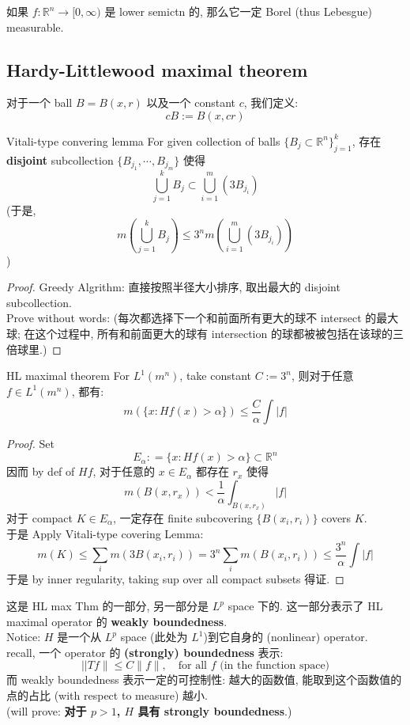 \documentclass[lang=cn,11pt]{elegantbook}
\begin{document}
\begin{corollary}
    如果 $f:\mathbb{R}^n \to [0,\infty)$ 是 lower semictn 的, 那么它一定 Borel (thus Lebesgue) measurable.
\end{corollary}




\subsection{Hardy-Littlewood maximal theorem}

对于一个 ball $B = B(x,r)$ 以及一个 constant $c$, 我们定义: \[
cB := B(x,cr)
\]
\begin{lemma}{Vitali-type convering lemma}
    For given collection of balls $\{B_j \subset \mathbb{R}^n\}_{j=1}^k$, 存在 \textbf{disjoint} subcollection $\{B_{j_1},\cdots, B_{j_m}\}$ 使得\[
\bigcup_{j=1}^k B_j  \subset \bigcup_{i=1}^m (3B_{j_i}) 
    \]
    (于是, \[
    m(\bigcup_{j=1}^k B_j) \leq 3^n m(\bigcup_{i=1}^m (3B_{j_i}))
    \])
\end{lemma}
\begin{proof}
    Greedy Algrithm: 直接按照半径大小排序, 取出最大的 disjoint subcollection.\\
    Prove without words: 
    (每次都选择下一个和前面所有更大的球不 intersect 的最大球; 在这个过程中, 所有和前面更大的球有 intersection 的球都被被包括在该球的三倍球里.)
\end{proof}




\begin{theorem}{HL maximal theorem}
For $L^1(m^n)$, take constant $C := 3^n$, 则对于任意 $f \in L^1(m^n)$, 都有: \[
m(\{x: Hf (x) > \alpha\}) \leq \frac{C}{\alpha} \int |f| 
\]
\end{theorem}
\begin{proof}
    Set \[
    E_\alpha : = \{x: Hf (x)> \alpha   \} \subset \mathbb{R}^n
    \]
    因而 by def of $Hf$, 对于任意的 $x \in E_\alpha$ 都存在 $r_x$ 使得 \[
    m(B(x,r_x))  < \frac{1}{\alpha} \int_{B(x,r_x)} |f|
    \]
对于 compact $K\in E_\alpha $, 一定存在 finite subcovering $\{B(x_i,r_i)\}$ covers $K$.\\
于是 Apply Vitali-type covering Lemma:\[
m(K) \leq \sum_i m(3B(x_i,r_i)) = 3^n \sum_i m(B(x_i,r_i)) \leq \frac{3^n}{\alpha} \int |f|
\]
于是 by inner regularity, taking sup over all compact subsets 得证.
\end{proof}
\begin{remark}
    这是 HL max Thm 的一部分, 另一部分是 $L^p$ space 下的.  这一部分表示了 HL maximal operator 的 \textbf{weakly boundedness}.\\
    Notice: $H$ 是一个从 $L^p$ space (此处为 $L^1$)到它自身的 (nonlinear) operator.\\
    recall, 一个 operator 的 \textbf{(strongly) boundedness} 表示: \[|| T f \|\leq C \| f \|, \quad \text{for all } f  \text{ (in the function space)}
\]
而 weakly boundedness 表示一定的可控制性: 越大的函数值, 能取到这个函数值的点的占比 (with respect to measure) 越小. \\
(will prove: \textbf{对于 $p>1$, $H$ 具有 strongly boundedness}.)
\end{remark}
\end{document}
